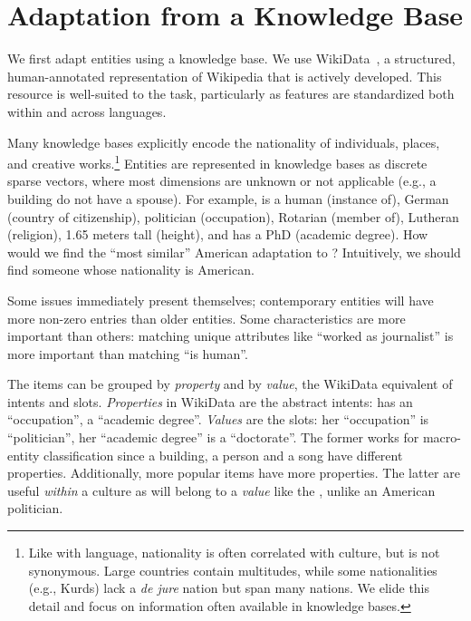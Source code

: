 \section{Adaptation from a Knowledge Base}
\label{sec:wikidata}

We first adapt entities using a knowledge base.
%
We use WikiData~\citep{vrandevcic2014wikidata}, a structured,
human-annotated representation of Wikipedia that is actively
developed.
%
This resource is well-suited to the task, particularly as features are
standardized both within and across languages.

Many knowledge bases explicitly encode the nationality of individuals,
places, and creative works.\footnote{Like with language, nationality
	is often correlated with culture, but is not synonymous.  Large
	countries contain multitudes, while some nationalities (e.g., Kurds)
	lack a \textit{de jure} nation but span many nations.  We elide this
	detail and focus on information often available in knowledge bases.}
%
Entities are represented in knowledge bases as discrete sparse
vectors, where most dimensions are unknown or not applicable (e.g., a building do not have a spouse).
%
For example,  is a human (instance of), German
(country of citizenship), politician (occupation), Rotarian (member
of), Lutheran (religion), 1.65 meters tall (height), and has a PhD
(academic degree).
%
How would we find the ``most similar'' American adaptation to
?
%
Intuitively, we should find someone whose nationality is American.

Some issues immediately present themselves; contemporary entities will
have more non-zero entries than older entities.
%
Some characteristics are more important than others: matching unique
attributes like ``worked as journalist'' is more important than
matching ``is human''.
%

The items can be grouped by \textit{property} and by \textit{value}, the WikiData equivalent of intents and slots. 
%
\textit{Properties} in WikiData are the abstract intents:  has an ``occupation'',  a ``academic degree''.  
%
\textit{Values} are the slots: her ``occupation'' is ``politician'', her ``academic degree'' is  a ``doctorate''.
%
The former works for macro-entity classification since a building, a person and a song have
different properties.
Additionally,  more popular items have more properties.
%
The latter are useful \textit{within} a culture as 
will belong to a \textit{value} like the  , unlike an
American politician.

